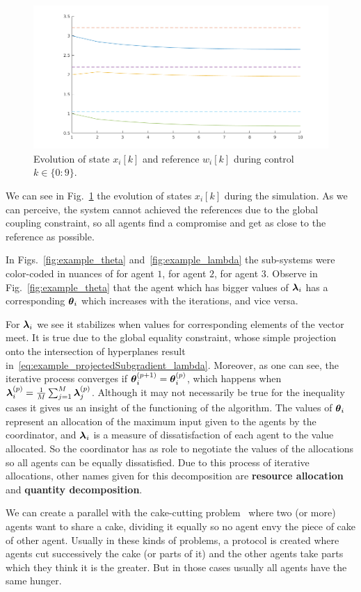\documentclass[../main.tex]{subfiles}
\begin{document}
\begin{figure}[h]
  \centering
  \includegraphics[width=.5\textwidth]{../img/example_state.png}
  \caption{Evolution of state $x_{i}[k]$ and reference $w_{i}[k]$ during control ${k\in\{0\mathbin{:}9\}}$. }\label{fig:example_state}
\end{figure}
We can see in Fig.~\ref{fig:example_state} the evolution of states $x_{i}[k]$ during the simulation.
As we can perceive, the system cannot achieved the references due to the global coupling constraint, so all agents find a compromise and get as close to the reference as possible.

In Figs.~\ref{fig:example_theta} and~\ref{fig:example_lambda} the sub-systems were color-coded in nuances of  for agent $1$,  for agent $2$,  for agent $3$.
Observe in Fig.~\ref{fig:example_theta} that the agent which has bigger values of $\boldsymbol{\lambda}_i$ has a corresponding $\boldsymbol{\theta}_i$ which increases with the iterations, and vice versa.

For $\boldsymbol{\lambda}_i$ we see it stabilizes when values for corresponding elements of the vector meet.
It is true due to the global equality constraint, whose simple projection onto the intersection of hyperplanes result in~\eqref{eq:example_projectedSubgradient_lambda}.
Moreover, as one can see, the iterative process converges if ${\boldsymbol{\theta}_i^{(p+1)}=\boldsymbol{\theta}_i^{(p)}}$, which happens when ${\boldsymbol{\lambda}_i^{(p)}=\frac{1}{M}\sum_{j=1}^{M}\boldsymbol{\lambda}_j^{(p)}}$.
Although it may not necessarily be true for the inequality cases it gives us an insight of the functioning of the algorithm.
The values of $\boldsymbol{\theta}_i$ represent an allocation of the maximum input given to the agents by the coordinator, and $\boldsymbol{\lambda}_i$ is a measure of dissatisfaction of each agent to the value allocated.
So the coordinator has as role to negotiate the values of the allocations so all agents can be equally dissatisfied.
Due to this process of iterative allocations, other names given for this decomposition are \textbf{resource allocation} and \textbf{quantity decomposition}.

We can create a parallel with the cake-cutting problem~\cite{BramsTaylor1995} where two (or more) agents want to share a cake, dividing it equally so no agent envy the piece of cake of other agent.
Usually in these kinds of problems, a protocol is created where agents cut successively the cake (or parts of it) and the other agents take parts which they think it is the greater.
But in those cases usually all agents have the same hunger.
\end{document}
